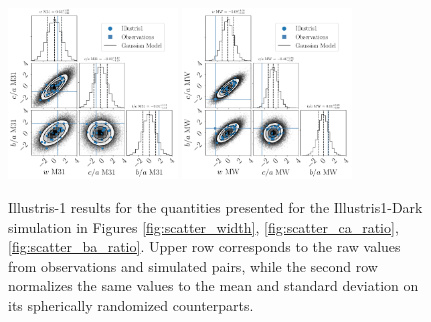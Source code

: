 \documentclass[a4paper,fleqn,usenatbib]{mnras}
\begin{document}
\begin{figure}
\includegraphics[width=0.40\textwidth]{gaussian_model_illustris1_M31_n_11.pdf}
\includegraphics[width=0.40\textwidth]{gaussian_model_illustris1_MW_n_11.pdf}
\caption{Illustris-1 results for the quantities presented for the Illustris1-Dark
  simulation in Figures  \ref{fig:scatter_width},
  \ref{fig:scatter_ca_ratio}, \ref{fig:scatter_ba_ratio}.
Upper row corresponds to the raw values from observations and
simulated pairs, while the second row normalizes the same values to
the mean and standard deviation on its spherically randomized
counterparts. 
\label{fig:all_plots_illustris1}}
\end{figure}
\end{document}
